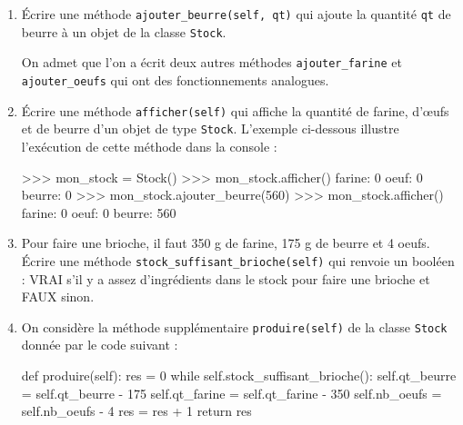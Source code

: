 \documentclass[
  letterpaper,
  DIV=11,
  numbers=noendperiod]{scrartcl}
\newenvironment{Shaded}{\begin{snugshade}}{\end{snugshade}}
\newcommand{\ControlFlowTok}[1]{\textcolor[rgb]{0.00,0.23,0.31}{#1}}
\newcommand{\DecValTok}[1]{\textcolor[rgb]{0.68,0.00,0.00}{#1}}
\newcommand{\KeywordTok}[1]{\textcolor[rgb]{0.00,0.23,0.31}{#1}}
\newcommand{\NormalTok}[1]{\textcolor[rgb]{0.00,0.23,0.31}{#1}}
\newcommand{\OperatorTok}[1]{\textcolor[rgb]{0.37,0.37,0.37}{#1}}
\newcommand{\VariableTok}[1]{\textcolor[rgb]{0.07,0.07,0.07}{#1}}
\begin{document}
\begin{enumerate}
\def\labelenumi{\arabic{enumi}.}
\item
  Écrire une méthode \texttt{ajouter\_beurre(self,\ qt)} qui ajoute la
  quantité \texttt{qt} de beurre à un objet de la classe \texttt{Stock}.

  On admet que l'on a écrit deux autres méthodes
  \texttt{ajouter\_farine} et \texttt{ajouter\_oeufs} qui ont des
  fonctionnements analogues.
\item
  Écrire une méthode \texttt{afficher(self)} qui affiche la quantité de
  farine, d'œufs et de beurre d'un objet de type \texttt{Stock}.
  L'exemple ci-dessous illustre l'exécution de cette méthode dans la
  console :

\begin{Shaded}
\begin{Highlighting}[]
\OperatorTok{\textgreater{}\textgreater{}\textgreater{}}\NormalTok{ mon\_stock }\OperatorTok{=}\NormalTok{ Stock() }
\OperatorTok{\textgreater{}\textgreater{}\textgreater{}}\NormalTok{ mon\_stock.afficher() }
\NormalTok{farine: }\DecValTok{0} 
\NormalTok{oeuf: }\DecValTok{0} 
\NormalTok{beurre: }\DecValTok{0} 
\OperatorTok{\textgreater{}\textgreater{}\textgreater{}}\NormalTok{ mon\_stock.ajouter\_beurre(}\DecValTok{560}\NormalTok{) }
\OperatorTok{\textgreater{}\textgreater{}\textgreater{}}\NormalTok{ mon\_stock.afficher() }
\NormalTok{farine: }\DecValTok{0} 
\NormalTok{oeuf: }\DecValTok{0} 
\NormalTok{beurre: }\DecValTok{560} 
\end{Highlighting}
\end{Shaded}
\item
  Pour faire une brioche, il faut 350 g de farine, 175 g de beurre et 4
  oeufs. Écrire une méthode \texttt{stock\_suffisant\_brioche(self)} qui
  renvoie un booléen : VRAI s'il y a assez d'ingrédients dans le stock
  pour faire une brioche et FAUX sinon.
\item
  On considère la méthode supplémentaire \texttt{produire(self)} de la
  classe \texttt{Stock} donnée par le code suivant :

\begin{Shaded}
\begin{Highlighting}[]
\KeywordTok{def}\NormalTok{ produire(}\VariableTok{self}\NormalTok{):}
\NormalTok{    res }\OperatorTok{=} \DecValTok{0} 
    \ControlFlowTok{while} \VariableTok{self}\NormalTok{.stock\_suffisant\_brioche():}
        \VariableTok{self}\NormalTok{.qt\_beurre }\OperatorTok{=} \VariableTok{self}\NormalTok{.qt\_beurre }\OperatorTok{{-}} \DecValTok{175} 
        \VariableTok{self}\NormalTok{.qt\_farine }\OperatorTok{=} \VariableTok{self}\NormalTok{.qt\_farine }\OperatorTok{{-}} \DecValTok{350} 
        \VariableTok{self}\NormalTok{.nb\_oeufs }\OperatorTok{=} \VariableTok{self}\NormalTok{.nb\_oeufs }\OperatorTok{{-}} \DecValTok{4} 
\NormalTok{        res }\OperatorTok{=}\NormalTok{ res }\OperatorTok{+} \DecValTok{1}
    \ControlFlowTok{return}\NormalTok{ res}
\end{Highlighting}
\end{Shaded}


\end{enumerate}
\end{document}
